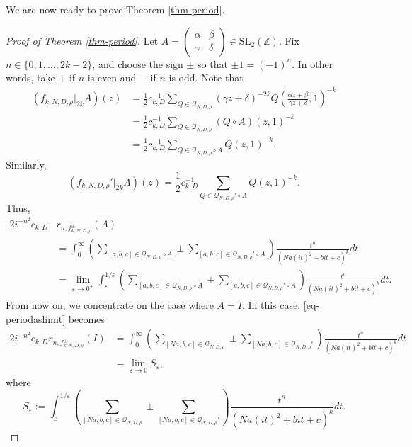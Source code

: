 \documentclass[12pt]{amsart}
\numberwithin{equation}{section}
\theoremstyle{definition}
\begin{document}
We are now ready to prove Theorem \ref{thm-period}.

\begin{proof}[Proof of Theorem \ref{thm-period}]
Let $A=\left(\begin{smallmatrix}
    \alpha & \beta \\ \gamma & \delta
\end{smallmatrix}\right)\in\mathrm{SL}_{2}(\mathbb{Z})$.
Fix $n\in\{0,1,\ldots,2k-2\}$, and choose the sign $\pm$ so that $\pm 1=(-1)^n$. In other words, take $+$ if $n$ is even and $-$ if $n$ is odd.
Note that
\begin{align*}
    (f_{k,N,D,\rho}|_{2k}A)(z)&=\frac{1}{2}c_{k,D}^{-1}\sum_{Q\in\mathcal{Q}_{N,D,\rho}}(\gamma z+\delta)^{-2k}Q\left(\frac{\alpha z+\beta}{\gamma z+\delta},1\right)^{-k}\\
    &=\frac{1}{2}c_{k,D}^{-1}\sum_{Q\in\mathcal{Q}_{N,D,\rho}}(Q\circ A)(z,1)^{-k}\\
    &=\frac{1}{2}c_{k,D}^{-1}\sum_{Q\in\mathcal{Q}_{N,D,\rho}\circ A}Q(z,1)^{-k}.
\end{align*}
Similarly,
$$(f_{k,N,D,\rho}'|_{2k}A)(z)=\frac{1}{2}c_{k,D}^{-1}\sum_{Q\in\mathcal{Q}_{N,D,\rho}'\circ A}Q(z,1)^{-k}.$$
Thus,
\begin{equation}\label{eq-periodaslimit}
    \begin{split}
        2i^{-n^{2}}c_{k,D}&r_{n,f_{k,N,D,\rho}^{\pm}}(A)\\&=\int_{0}^{\infty}\left(\sum_{[a,b,c]\in\mathcal{Q}_{N,D,\rho}\circ A}\pm\sum_{[a,b,c]\in\mathcal{Q}_{N,D,\rho}'\circ A}\right)\frac{t^{n}}{(Na(it)^{2}+bit+c)^{k}}dt\\
        &=\lim_{\varepsilon\rightarrow 0^{+}}\int_{\varepsilon}^{1/\varepsilon}\left(\sum_{[a,b,c]\in\mathcal{Q}_{N,D,\rho}\circ A}\pm\sum_{[a,b,c]\in\mathcal{Q}_{N,D,\rho}'\circ A}\right)\frac{t^{n}}{(Na(it)^{2}+bit+c)^{k}}dt.
    \end{split}
\end{equation}
From now on, we concentrate on the case where $A=I$. In this case, \eqref{eq-periodaslimit} becomes
\begin{align*}
    2i^{-n^{2}}c_{k,D}r_{n,f_{k,N,D,\rho}^{\pm}}(I)&=\int_{0}^{\infty}\left(\sum_{[Na,b,c]\in\mathcal{Q}_{N,D,\rho}}\pm\sum_{[Na,b,c]\in\mathcal{Q}_{N,D,\rho}'}\right)\frac{t^{n}}{(Na(it)^{2}+bit+c)^{k}}dt\\
    &=\lim_{\varepsilon\rightarrow 0}S_{\varepsilon},
\end{align*}
where
$$S_{\varepsilon}:=\int_{\varepsilon}^{1/\varepsilon}\left(\sum_{[Na,b,c]\in\mathcal{Q}_{N,D,\rho}}\pm\sum_{[Na,b,c]\in\mathcal{Q}_{N,D,\rho}'}\right)\frac{t^{n}}{(Na(it)^{2}+bit+c)^{k}}dt.$$

\end{proof}
\end{document}
